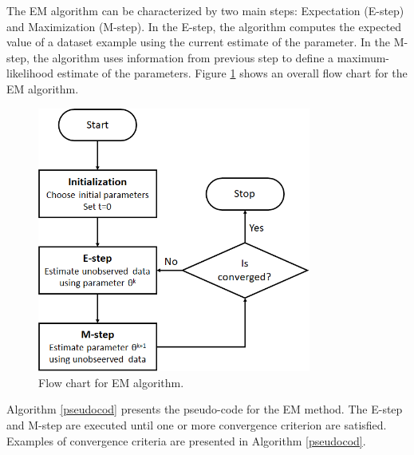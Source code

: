 
The EM algorithm can be characterized by two main steps: Expectation (E-step) and Maximization (M-step). In the E-step, the algorithm computes the expected value of a dataset example using the current estimate of the parameter. In the M-step, the algorithm uses information from previous step to define a maximum-likelihood estimate of the parameters. Figure \ref{EM-algorithm} shows an overall flow chart for the EM algorithm.


\begin{figure}[ht]
\centering
\includegraphics[width=9cm]{figures/algorithm.png}
\caption{Flow chart for EM algorithm.}
\label{EM-algorithm}
\end{figure}


Algorithm \ref{pseudocod} presents the pseudo-code for the EM method. The E-step and M-step are executed until one or more convergence criterion are satisfied. Examples of convergence criteria are presented in Algorithm \ref{pseudocod}.

